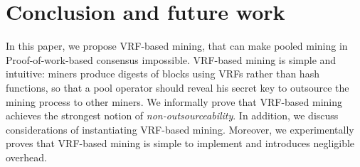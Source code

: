 \section{Conclusion and future work}
\label{sec:conclusion}

In this paper, we propose VRF-based mining, that can make pooled mining in Proof-of-work-based consensus impossible.
VRF-based mining is simple and intuitive: miners produce digests of blocks using VRFs rather than hash functions, so that a pool operator should reveal his secret key to outsource the mining process to other miners.
We informally prove that VRF-based mining achieves the strongest notion of \emph{non-outsourceability}.
In addition, we discuss considerations of instantiating VRF-based mining.
Moreover, we experimentally proves that VRF-based mining is simple to implement and introduces negligible overhead.